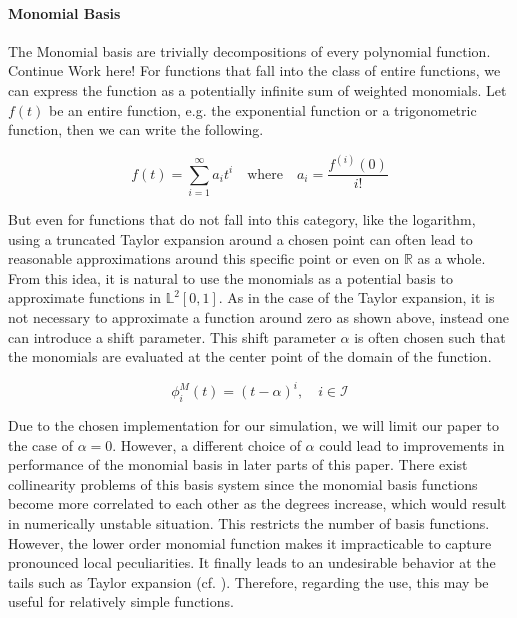 \documentclass[11pt,twoside,a4paper]{article}
\begin{document}
	\paragraph{Monomial Basis}
	The Monomial basis are trivially decompositions of every polynomial function. {\color{red} Continue Work here!}	
	For functions that fall into the class of entire functions, we can express the function as a potentially infinite sum of weighted monomials. Let $f(t)$ be an entire function, e.g. the exponential function or a trigonometric function, then we can write the following.
	
	\begin{equation}\label{Taylor_expansion}
		f(t) = \sum_{i = 1}^{\infty}a_i t^i \quad \text{where} \quad a_i = \frac{f^{(i)}(0)}{i!}
	\end{equation}
	
	But even for functions that do not fall into this category, like the logarithm, using a truncated Taylor expansion around a chosen point can often lead to reasonable approximations around this specific point or even on $\mathbb{R}$ as a whole. From this idea, it is natural to use the monomials as a potential basis to approximate functions in $\mathbb{L}^2[0,1]$. As in the case of the Taylor expansion, it is not necessary to approximate a function around zero as shown above, instead one can introduce a shift parameter. This shift parameter $\alpha$ is often chosen such that the monomials are evaluated at the center point of the domain of the function.
	
	\begin{equation}
		\phi_{i}^{M}(t) = (t-\alpha)^i, \quad i \in \mathcal{I}
	\end{equation}

	Due to the chosen implementation for our simulation, we will limit our paper to the case of $\alpha = 0$. However, a different choice of $\alpha$ could lead to improvements in performance of the monomial basis in later parts of this paper.
	There exist collinearity problems of this basis system since the monomial basis functions become more correlated to each other as the degrees increase, which would result in numerically unstable situation. This restricts the number of basis functions. However, the lower order monomial function makes it impracticable to capture pronounced local peculiarities. It finally leads to an undesirable behavior at the tails such as Taylor expansion (cf. \cite{ramsay_functional_2005}). Therefore, regarding the use, this may be useful for relatively simple functions.
	
\end{document}
